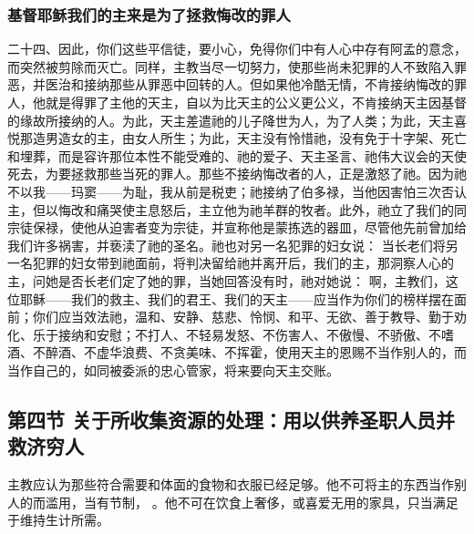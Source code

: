 
\subsubsection{基督耶稣我们的主来是为了拯救悔改的罪人}

二十四、因此，你们这些平信徒，要小心，免得你们中有人心中存有阿孟的意念，而突然被剪除而灭亡。同样，主教当尽一切努力，使那些尚未犯罪的人不致陷入罪恶，并医治和接纳那些从罪恶中回转的人。但如果他冷酷无情，不肯接纳悔改的罪人，他就是得罪了主他的天主，自以为比天主的公义更公义，不肯接纳天主因基督的缘故所接纳的人。为此，天主差遣祂的儿子降世为人，为了人类；为此，天主喜悦那造男造女的主，由女人所生；为此，天主没有怜惜祂，没有免于十字架、死亡和埋葬，而是容许那位本性不能受难的、祂的爱子、天主圣言、祂伟大议会的天使死去，为要拯救那些当死的罪人。那些不接纳悔改者的人，正是激怒了祂。因为祂不以我——玛窦——为耻，我从前是税吏；祂接纳了伯多禄，当他因害怕三次否认主，但以悔改和痛哭使主息怒后，主立他为祂羊群的牧者。此外，祂立了我们的同宗徒保禄，使他从迫害者变为宗徒，并宣称他是蒙拣选的器皿，尽管他先前曾加给我们许多祸害，并亵渎了祂的圣名。祂也对另一名犯罪的妇女说：  当长老们将另一名犯罪的妇女带到祂面前，将判决留给祂并离开后，我们的主，那洞察人心的主，问她是否长老们定了她的罪，当她回答没有时，祂对她说：  啊，主教们，这位耶稣——我们的救主、我们的君王、我们的天主——应当作为你们的榜样摆在面前；你们应当效法祂，温和、安静、慈悲、怜悯、和平、无欲、善于教导、勤于劝化、乐于接纳和安慰；不打人、不轻易发怒、不伤害人、不傲慢、不骄傲、不嗜酒、不醉酒、不虚华浪费、不贪美味、不挥霍，使用天主的恩赐不当作别人的，而当作自己的，如同被委派的忠心管家，将来要向天主交账。\par


\subsection{第四节 关于所收集资源的处理：用以供养圣职人员并救济穷人}

主教应认为那些符合需要和体面的食物和衣服已经足够。他不可将主的东西当作别人的而滥用，当有节制， 。他不可在饮食上奢侈，或喜爱无用的家具，只当满足于维持生计所需。\par

